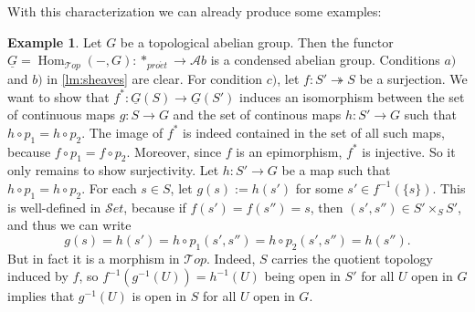 \documentclass[11pt,A4]{article}
\theoremstyle{plain}
\theoremstyle{definition}
\newtheorem{exa}[thm]{Example}
\theoremstyle{remark}
\newcommand{\Top}{\mathscr{T}op}
\newcommand{\Ab}{\mathscr{A}b}
\newcommand{\Set}{\mathscr{S}et}
\DeclareMathOperator{\Hom}{Hom}
\newcommand{\pe}{*_{pro\acute et}}
\renewcommand{\u}[1]{\underline{#1}}
\begin{document}
With this characterization we can already produce some examples:

\begin{exa}
    Let $G$ be a topological abelian group. Then the functor $\u{G}=\Hom_{\Top}(-,G)\colon \pe\to \Ab$ is a condensed abelian group.
    Conditions $a)$ and $b)$ in \cref{lm:sheaves} are clear.
    For condition $c)$, let $f\colon S'\twoheadrightarrow S$ be a surjection.
    We want to show that $f^{*}\colon \u{G}(S)\to \u{G}(S')$ induces an isomorphism between the set of continuous maps $g\colon S\to G$ and the set of continous maps $h\colon S'\to G$ such that $h\circ p_{1}=h\circ p_{2}$.
    The image of $f^{*}$ is indeed contained in the set of all such maps, because $f\circ p_{1}=f\circ p_{2}$.
    Moreover, since $f$ is an epimorphism, $f^{*}$ is injective.
    So it only remains to show surjectivity.
    Let $h\colon S'\to G$ be a map such that $h\circ p_{1}=h\circ p_{2}$.
    For each $s\in S$, let $g(s):=h(s')$ for some $s'\in f^{-1}(\{s\})$.
    This is well-defined in $\Set$, because if $f(s')=f(s'')=s$, then $(s',s'')\in S'\times_{S}S'$, and thus we can write
    \[ g(s)=h(s')=h\circ p_{1}(s',s'')=h\circ p_{2}(s',s'')=h(s'').\]
    But in fact it is a morphism in $\Top$.
    Indeed, $S$ carries the quotient topology induced by $f$, so $f^{-1}(g^{-1}(U))=h^{-1}(U)$ being open in $S'$ for all $U$ open in $G$ implies that $g^{-1}(U)$ is open in $S$ for all $U$ open in $G$.
\end{exa}



\end{document}
